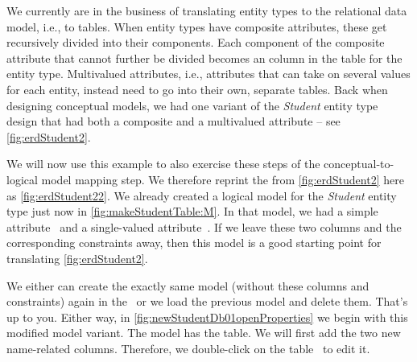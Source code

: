 %
%
%
%
%
%
%
%
%
We currently are in the business of translating entity types to the relational data model, i.e., to tables.
When entity types have composite attributes, these get recursively divided into their components.
Each component of the composite attribute that cannot further be divided becomes an column in the table for the entity type.
Multivalued attributes, i.e., attributes that can take on several values for each entity, instead need to go into their own, separate tables.
Back when designing conceptual models, we had one variant of the \emph{Student} entity type design that had both a composite and a multivalued attribute -- see \cref{fig:erdStudent2}.

We will now use this example to also exercise these steps of the conceptual-to-logical model mapping step.
We therefore reprint the  from \cref{fig:erdStudent2} here as \cref{fig:erdStudent22}.
We already created a logical model for the \emph{Student} entity type just now in \cref{fig:makeStudentTable:M}.
In that model, we had a simple attribute~ and a single-valued attribute~.
If we leave these two columns and the corresponding constraints away, then this model is a good starting point for translating \cref{fig:erdStudent2}.

We either can create the exactly same model (without these columns and constraints) again in the \pgmodeler\ or we load the previous model and delete them.
That's up to you.
Either way, in \cref{fig:newStudentDb01openProperties} we begin with this modified model variant.
The model has the  table.
We will first add the two new name-related columns.
Therefore, we double-click on the table~ to edit it.

